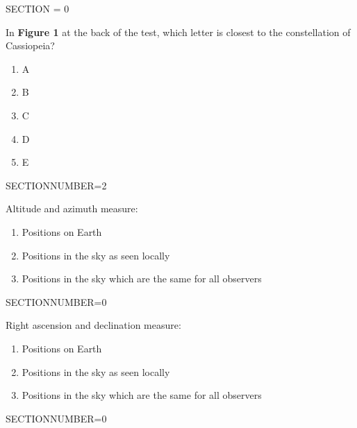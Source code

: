 \documentclass[11pt]{article}
\begin{document}
\begin{enumerate}
\setlength{\itemsep}{1pt} 
\setlength{\parskip}{0pt} 
\setlength{\parsep}{0pt}
\setlength{\multicolsep}{1pt} 

\pagebreak 
\begin{minipage}{\textwidth} 
\begin{minipage}{\textwidth} 
\bigskip SECTION = 0
\end{minipage}
\end{minipage}
\begin{minipage}{\textwidth}
\begin{minipage}{\textwidth}
\item In {\bf Figure 1} at the back of the test, which letter is closest to the constellation of  Cassiopeia?
\begin{multicols}{3}
\begin{enumerate} 
\setlength{\itemsep}{1pt} 
\setlength{\parskip}{0pt} 
\setlength{\parsep}{0pt}
\setlength{\multicolsep}{1pt} 
\item A
\item B
\item C
\item D
\item E
\end{enumerate} 
\vfill 
\end{multicols}

\end{minipage}
SECTIONNUMBER=2
\end{minipage}
\vskip 0.20in

\begin{minipage}{\textwidth}
\begin{minipage}{\textwidth}
\item Altitude and azimuth measure:
\begin{enumerate} 
\setlength{\itemsep}{1pt} 
\setlength{\parskip}{0pt} 
\setlength{\parsep}{0pt}
\setlength{\multicolsep}{1pt} 
\item Positions on Earth
\item Positions in the sky as seen locally
\item Positions in the sky which are the same for all observers
\end{enumerate} 
\end{minipage}
SECTIONNUMBER=0
\end{minipage}
\vskip 0.20in

\begin{minipage}{\textwidth}
\begin{minipage}{\textwidth}
\item Right ascension and declination measure:
\begin{enumerate} 
\setlength{\itemsep}{1pt} 
\setlength{\parskip}{0pt} 
\setlength{\parsep}{0pt}
\setlength{\multicolsep}{1pt} 
\item Positions on Earth
\item Positions in the sky as seen locally
\item Positions in the sky which are the same for all observers
\end{enumerate} 
\end{minipage}
SECTIONNUMBER=0
\end{minipage}
\vskip 0.20in


\end{enumerate}
\end{document}

